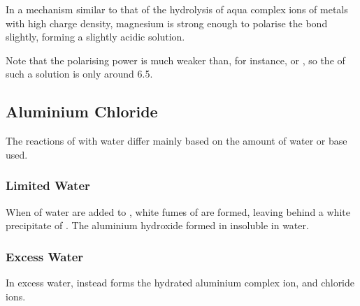 
			In a mechanism similar to that of the hydrolysis of aqua complex ions of metals with high charge density, magnesium is strong
			enough to polarise the  bond slightly, forming a slightly acidic solution.


			Note that the polarising power is much weaker than, for instance,  or , so the \pH{} of such a
			solution is only around \num{6.5}.




		\pagebreak
		\subsection{Aluminium Chloride}

			The reactions of  with water differ mainly based on the amount of water or base used.

			\subsubsection{Limited Water}

				When  of water are added to , white fumes of  are formed, leaving behind a white
				precipitate of . The aluminium hydroxide formed in insoluble in water.



			\subsubsection{Excess Water}

				In excess water,  instead forms the hydrated aluminium complex ion, and chloride ions.

